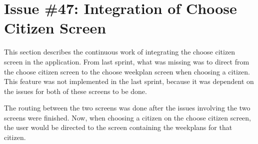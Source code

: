 \section{Issue \#47: Integration of Choose Citizen Screen}
This section describes the continuous work of integrating the choose citizen screen in the application. 
From last sprint, what was missing was to direct from the choose citizen screen to the choose weekplan screen when choosing a citizen. This feature was not implemented in the last sprint, because it was dependent on the issues for both of these screens to be done. 

The routing between the two screens was done after the issues involving the two screens were finished.
Now, when choosing a citizen on the choose citizen screen, the user would be directed to the screen containing the weekplans for that citizen.





